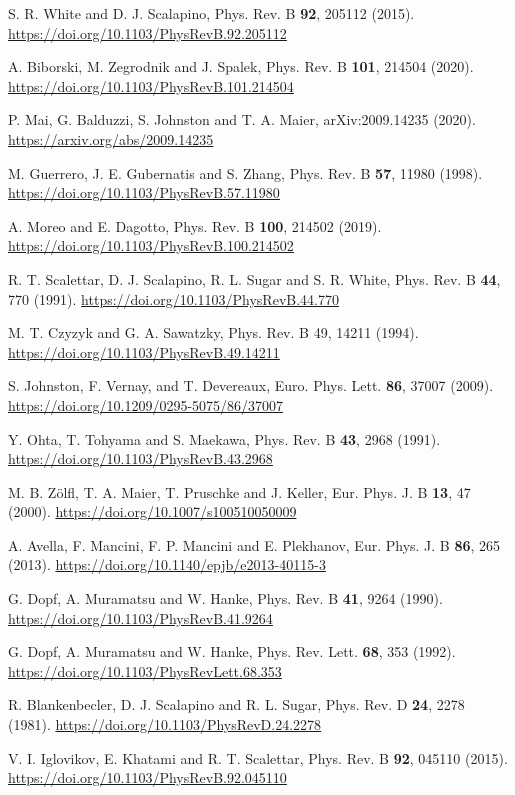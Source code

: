 \documentclass[reprint,nofootinbib,nobibnotes,amsmath,amssymb,aps,prb,floatfix]{revtex4-2}
\begin{document}
\begin{thebibliography}{99}
S. R. White and D. J. Scalapino, Phys. Rev. B {\bf 92}, 205112 (2015).  \url{https://doi.org/10.1103/PhysRevB.92.205112}

 A. Biborski, M. Zegrodnik and J. Spalek, Phys. Rev. B {\bf 101}, 214504 (2020). \url{https://doi.org/10.1103/PhysRevB.101.214504}

 P. Mai, G. Balduzzi, S. Johnston and T. A. Maier, arXiv:2009.14235 (2020). \url{https://arxiv.org/abs/2009.14235}

 M. Guerrero, J. E. Gubernatis and S. Zhang, Phys. Rev. B {\bf 57}, 11980 (1998). \url{https://doi.org/10.1103/PhysRevB.57.11980}

  A. Moreo and E. Dagotto, Phys. Rev. B {\bf 100}, 214502 (2019). \url{https://doi.org/10.1103/PhysRevB.100.214502}

 R. T. Scalettar, D. J. Scalapino, R. L. Sugar and S. R. White, Phys. Rev. B {\bf 44}, 770 (1991). \url{https://doi.org/10.1103/PhysRevB.44.770}

 M. T. Czyzyk and G. A. Sawatzky, Phys. Rev. B 49, 14211 (1994). \url{https://doi.org/10.1103/PhysRevB.49.14211}

 S. Johnston, F. Vernay, and T. Devereaux, Euro. Phys. Lett. {\bf 86}, 37007 (2009). \url{https://doi.org/10.1209/0295-5075/86/37007}

 Y. Ohta, T. Tohyama and S. Maekawa,  Phys. Rev. B {\bf 43}, 2968 (1991). \url{https://doi.org/10.1103/PhysRevB.43.2968}

 M. B. Z\"{o}lfl, T. A. Maier, T. Pruschke and J. Keller, Eur. Phys. J. B {\bf 13}, 47 (2000). \url{https://doi.org/10.1007/s100510050009}

 A. Avella, F. Mancini, F. P. Mancini and E. Plekhanov, Eur. Phys. J. B {\bf 86}, 265 (2013). \url{https://doi.org/10.1140/epjb/e2013-40115-3}

 G. Dopf, A. Muramatsu and W. Hanke, Phys. Rev. B {\bf 41}, 9264 (1990). \url{https://doi.org/10.1103/PhysRevB.41.9264}

 G. Dopf, A. Muramatsu and W. Hanke, Phys. Rev. Lett. {\bf 68}, 353 (1992). \url{https://doi.org/10.1103/PhysRevLett.68.353}

 R. Blankenbecler, D. J. Scalapino and  R. L. Sugar, Phys.  Rev. D {\bf 24}, 2278 (1981). \url{https://doi.org/10.1103/PhysRevD.24.2278}

 V. I. Iglovikov, E. Khatami and R. T. Scalettar, Phys. Rev. B {\bf 92}, 045110 (2015). \url{https://doi.org/10.1103/PhysRevB.92.045110}


\end{thebibliography}
\end{document}
